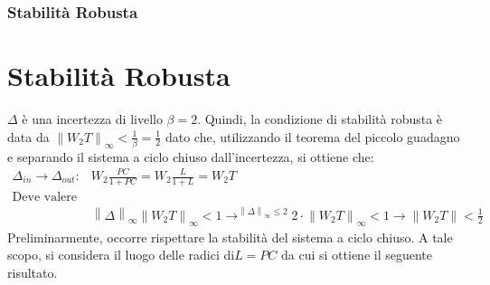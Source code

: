 \documentclass{beamer}
\begin{document}
\begin{frame}
	\frametitle{Stabilità Robusta}%
	\section{Stabilità Robusta}
	\(\Delta \) è una incertezza di livello \(\beta = 2\). Quindi, la condizione di stabilità robusta è data da \(\left\lVert W_{2}T\right\rVert_{\infty}<\frac{1}{\beta}=\frac{1}{2}\) dato che, utilizzando il teorema del piccolo guadagno e separando il sistema a ciclo chiuso dall'incertezza, si ottiene che:
	\begin{align*}
		\Delta_{in}\rightarrow \Delta_{out}: & W_{2}\frac{PC}{1+PC}=W_{2}\frac{L}{1+L}=W_{2}T                                                                                                                                                                                                        \\
		\text{Deve valere che:}                                                                                                                                                                                                                                                                      \\
		                                     & \left\lVert \Delta\right\rVert_{\infty}\left\lVert W_{2}T\right\rVert_{\infty}<1\longrightarrow^{\left\lVert \Delta\right\rVert_{\infty}\leq 2} 2\cdot\left\lVert W_{2}T\right\rVert_{\infty}<1\rightarrow \left\lVert W_{2}T\right\rVert<\frac{1}{2}
	\end{align*}
	Preliminarmente, occorre rispettare la stabilità del sistema a ciclo chiuso. A tale scopo, si considera il luogo delle radici di\(L=PC\) da cui si ottiene il seguente risultato.

\end{frame}
\end{document}
